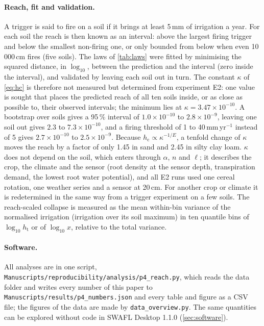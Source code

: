 \documentclass[preprint,12pt,authoryear]{elsarticle}
\newcommand{\hc}{h_{\mathrm{c}}}
\newcommand{\htr}{h_{\mathrm{t}}}
\begin{document}
\paragraph{Reach, fit and validation.}
A trigger is said to fire on a soil if it brings at least 5\,mm of irrigation a year. For each soil the reach is then known as an interval: above the largest firing trigger and below the smallest non-firing one, or only bounded from below when even 10\,000\,cm fires (five soils). The laws of \cref{tab:laws} were fitted by minimising the squared distance, in $\log_{10}$, between the prediction and the interval (zero inside the interval), and validated by leaving each soil out in turn. The constant $\kappa$ of \cref{eq:hc} is therefore not measured but determined from experiment E2: one value is sought that places the predicted reach of all ten soils inside, or as close as possible to, their observed intervals; the minimum lies at $\kappa=3.47\times10^{-10}$. A bootstrap over soils gives a 95\,\% interval of $1.0\times10^{-10}$ to $2.8\times10^{-9}$, leaving one soil out gives $2.3$ to $7.3\times10^{-10}$, and a firing threshold of 1 to 40\,mm\,yr$^{-1}$ instead of 5 gives $2.7\times10^{-10}$ to $2.5\times10^{-9}$. Because $\hc\propto\kappa^{-1/E}$, a tenfold change of $\kappa$ moves the reach by a factor of only 1.45 in sand and 2.45 in silty clay loam. $\kappa$ does not depend on the soil, which enters through $\alpha$, $n$ and $\ell$; it describes the crop, the climate and the sensor (root density at the sensor depth, transpiration demand, the lowest root water potential), and all E2 runs used one cereal rotation, one weather series and a sensor at 20\,cm. For another crop or climate it is redetermined in the same way from a trigger experiment on a few soils. The reach-scaled collapse is measured as the mean within-bin variance of the normalised irrigation (irrigation over its soil maximum) in ten quantile bins of $\log_{10}\htr$ or of $\log_{10}x$, relative to the total variance.

\paragraph{Software.}
All analyses are in one script, \nolinkurl{Manuscripts/reproducibility/analysis/p4_reach.py}, which reads the data folder and writes every number of this paper to \nolinkurl{Manuscripts/results/p4_numbers.json} and every table and figure as a CSV file; the figures of the data are made by \texttt{data\_overview.py}. The same quantities can be explored without code in SWAFL Desktop 1.1.0 (\cref{sec:software}).
\end{document}
